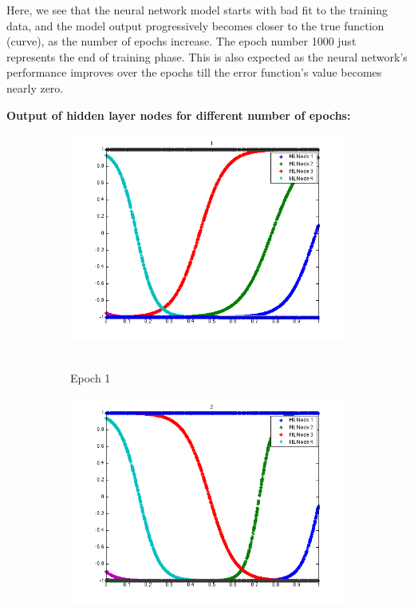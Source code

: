 \begin{flushleft}

Here, we see that the neural network model starts with bad fit to the training data, and the model output progressively becomes closer to the true function (curve), as the number of epochs increase. The epoch number 1000 just represents the end of training phase. This is also expected as the neural network's performance improves over the epochs till the error function's value becomes nearly zero. 
\end{flushleft}

\newpage
\textbf{Output of hidden layer nodes for different number of epochs: \\[10pt]}

\begin{figure}
\begin{subfigure}{.5\textwidth}
  \centering
  \includegraphics[width=.8\linewidth]{Regression/univariate/hiddenLayer_1.png}\
  \caption{Epoch 1}
\end{subfigure}%
\begin{subfigure}{.5\textwidth}
  \centering
  \includegraphics[width=.8\linewidth]{Regression/univariate/hiddenLayer_2.png}

\end{subfigure}
\end{figure}
